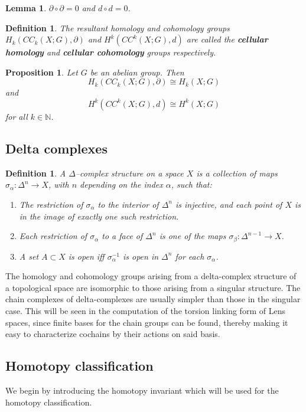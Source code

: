 \documentclass{article}
\newtheorem{definition}[theorem]{Definition}
\newtheorem{lemma}[theorem]{Lemma}
\newtheorem{proposition}[theorem]{Proposition}
\begin{document}
\begin{lemma}
$\partial\circ\partial=0$ and $d\circ d=0$.
\end{lemma}

\begin{definition}
The resultant homology and cohomology groups $H_k(CC_k(X;G),\partial)$ and $H^k(CC^k(X;G),d)$ are called the \textbf{cellular homology} and \textbf{cellular cohomology} groups respectively.
\end{definition}

\begin{proposition}
Let $G$ be an abelian group. Then\[H_k(CC_k(X;G),\partial)\cong H_k(X;G)\] and \[H^k(CC^k(X;G),d)\cong H^k(X;G)\] for all $k\in\mathbb{N}$.
\end{proposition}

\subsection{Delta complexes}
\begin{definition}
A $\Delta$--complex structure on a space $X$ is a collection of maps $\sigma_\alpha\colon\Delta^n\to X$, with $n$ depending on the index $\alpha$, such that:
\begin{enumerate}
    \item The restriction of $\sigma_\alpha$ to the interior of $\Delta^n$ is injective, and each point of $X$ is in the image of exactly one such restriction.
    \item Each restriction of $\sigma_\alpha$ to a face of $\Delta^n$ is one of the maps $\sigma_\beta\colon\Delta^{n-1}\to X$.
    \item A set $A\subset X$ is open iff $\sigma_\alpha^{-1}$ is open in $\Delta^n$ for each $\sigma_\alpha$.
\end{enumerate}
\end{definition}

\noindent The homology and cohomology groups arising from a delta-complex structure of a topological space are isomorphic to those arising from a singular structure. The chain complexes of delta-complexes are usually simpler than those in the singular case. This will be seen in the computation of the torsion linking form of Lens spaces, since finite bases for the chain groups can be found, thereby making it easy to characterize cochains by their actions on said basis.




\subsection{Homotopy classification}
We begin by introducing the homotopy invariant which will be used for the homotopy classification.
\end{document}
